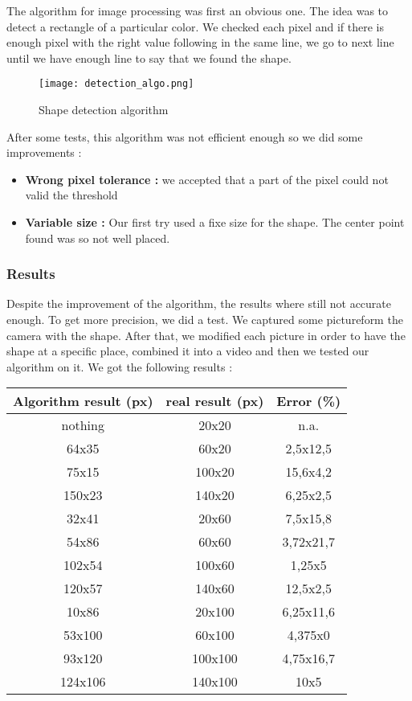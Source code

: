 The algorithm for image processing was first an obvious one. The idea was to detect a rectangle of a particular color. We checked each pixel and if there is enough pixel with the right value following in the same line, we go to next line until we have enough line to say that we found the shape.

\begin{figure}[!ht]
\centering
 \texttt{[image: detection\_algo.png]}
 \caption{Shape detection algorithm}
 \label{spe_det}
\end{figure}

After some tests, this algorithm was not efficient enough so we did some improvements : 

\begin{itemize}
 \item \textbf{Wrong pixel tolerance : } we accepted that a part of the pixel could not valid the threshold
 \item \textbf{Variable size : } Our first try used a fixe size for the shape. The center point found was so not well placed.
\end{itemize}

\subsubsection{Results}

Despite the improvement of the algorithm, the results where still not accurate enough. To get more precision, we did a test. We captured  some pictureform the camera with the shape. After that, we modified each picture in order to have the shape at a specific place, combined it into a video and then we tested our algorithm on it. We got the following results : 

    \begin{center}
\begin{tabular}{|c|c|c|}\hline
Algorithm result (px) & real result (px) & Error (\%)\\\hline
nothing & 20x20 & n.a.\\\hline
64x35 & 60x20 & 2,5x12,5\\\hline
75x15 & 100x20 & 15,6x4,2\\\hline
150x23 & 140x20 & 6,25x2,5\\\hline
32x41 & 20x60 & 7,5x15,8\\\hline
54x86 & 60x60 & 3,72x21,7\\\hline
102x54 & 100x60 & 1,25x5\\\hline
120x57 & 140x60 & 12,5x2,5\\\hline
10x86 & 20x100 & 6,25x11,6\\\hline
53x100 & 60x100 & 4,375x0\\\hline
93x120 & 100x100 & 4,75x16,7\\\hline
124x106 & 140x100 & 10x5\\\hline
    \end{tabular}
    \end{center}

